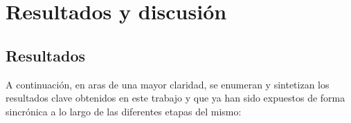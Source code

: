 \chapter{Resultados y discusión}
\label{chap:resultados}


\section{Resultados}

A continuación, en aras de una mayor claridad, se enumeran y sintetizan los resultados clave obtenidos en este trabajo y que ya han sido expuestos de forma sincrónica a lo largo de las diferentes etapas del mismo:



